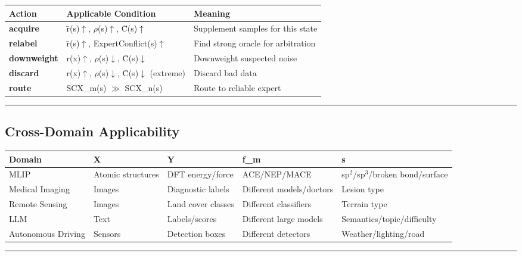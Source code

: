 \documentclass[
  12pt,
]{article}
\begin{document}
\begin{longtable}[]{@{}lll@{}}
\toprule\noalign{}
Action & Applicable Condition & Meaning \\
\midrule\noalign{}
\endhead
\bottomrule\noalign{}
\endlastfoot
\textbf{acquire} & \={r}(s)$\uparrow$, $\rho$(s)$\uparrow$, \={C}(s)$\uparrow$ & Supplement samples for this state \\
\textbf{relabel} & \={r}(s)$\uparrow$, ExpertConflict(s)$\uparrow$ & Find strong oracle for arbitration \\
\textbf{downweight} & r(x)$\uparrow$, $\rho$(s)$\downarrow$, \={C}(s)$\downarrow$ & Downweight suspected noise \\
\textbf{discard} & r(x)$\uparrow$, $\rho$(s)$\downarrow$, \={C}(s)$\downarrow$ (extreme) & Discard bad data \\
\textbf{route} & SCX\_m(s) $\gg$ SCX\_n(s) & Route to reliable expert \\
\end{longtable}

\begin{center}\rule{0.5\linewidth}{0.5pt}\end{center}

\subsection{Cross-Domain Applicability}\label{cross-domain-applicability}

\begin{longtable}[]{@{}lllll@{}}
\toprule\noalign{}
Domain & X & Y & f\_m & s \\
\midrule\noalign{}
\endhead
\bottomrule\noalign{}
\endlastfoot
MLIP & Atomic structures & DFT energy/force & ACE/NEP/MACE & sp$^2$/sp$^3$/broken bond/surface \\
Medical Imaging & Images & Diagnostic labels & Different models/doctors & Lesion type \\
Remote Sensing & Images & Land cover classes & Different classifiers & Terrain type \\
LLM & Text & Labels/scores & Different large models & Semantics/topic/difficulty \\
Autonomous Driving & Sensors & Detection boxes & Different detectors & Weather/lighting/road \\
\end{longtable}

\begin{center}\rule{0.5\linewidth}{0.5pt}\end{center}
\end{document}
